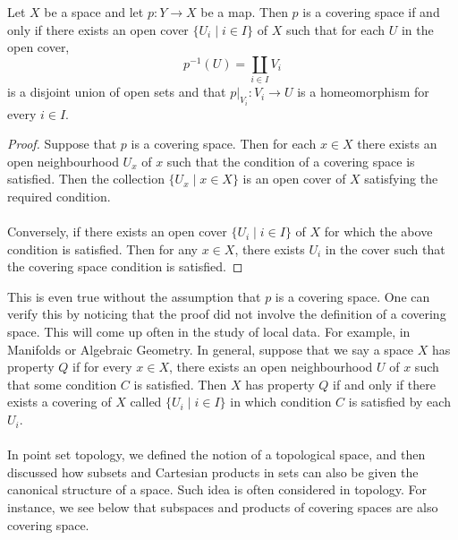 \documentclass[a4paper]{article}
\begin{document}
\begin{prp}{}{} Let $X$ be a space and let $p:Y\to X$ be a map. Then $p$ is a covering space if and only if there exists an open cover $\{U_i\;|\;i\in I\}$ of $X$ such that for each $U$ in the open cover, $$p^{-1}(U)=\coprod_{i\in I}V_i$$ is a disjoint union of open sets and that $p|_{V_i}:V_i\to U$ is a homeomorphism for every $i\in I$. \tcbline
\begin{proof}
Suppose that $p$ is a covering space. Then for each $x\in X$ there exists an open neighbourhood $U_x$ of $x$ such that the condition of a covering space is satisfied. Then the collection $\{U_x\;|\;x\in X\}$ is an open cover of $X$ satisfying the required condition. \\~\\

Conversely, if there exists an open cover $\{U_i\;|\;i\in I\}$ of $X$ for which the above condition is satisfied. Then for any $x\in X$, there exists $U_i$ in the cover such that the covering space condition is satisfied. 
\end{proof}
\end{prp}

This is even true without the assumption that $p$ is a covering space. One can verify this by noticing that the proof did not involve the definition of a covering space. This will come up often in the study of local data. For example, in Manifolds or Algebraic Geometry. In general, suppose that we say a space $X$ has property $Q$ if for every $x\in X$, there exists an open neighbourhood $U$ of $x$ such that some condition $C$ is satisfied. Then $X$ has property $Q$ if and only if there exists a covering of $X$ called $\{U_i\;|\;i\in I\}$ in which condition $C$ is satisfied by each $U_i$. \\~\\

In point set topology, we defined the notion of a topological space, and then discussed how subsets and Cartesian products in sets can also be given the canonical structure of a space. Such idea is often considered in topology. For instance, we see below that subspaces and products of covering spaces are also covering space. 
\end{document}
